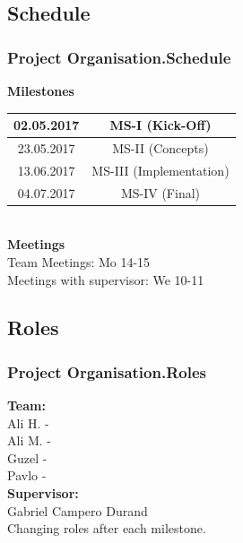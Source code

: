 \documentclass{beamer}
\begin{document}
\subsection{Schedule}
\begin{frame}
\frametitle{Project Organisation.Schedule}
\textbf{Milestones} \\
\vspace{0.5 cm}
\begin{tabular}{|c|c|}
\hline 
02.05.2017 & MS-I (Kick-Off) \\ 
\hline 
23.05.2017 & MS-II (Concepts) \\ 
\hline 
13.06.2017 & MS-III (Implementation) \\ 
\hline 
04.07.2017 & MS-IV (Final) \\ 
\hline 
\end{tabular}
\\ \vspace{0.5 cm}
\textbf{Meetings} \\ 
\vspace{0.5 cm}
\hspace{0.5 cm} Team Meetings: Mo 14-15 \\
\hspace{0.5 cm} Meetings with supervisor: We 10-11

\end{frame}

\subsection{Roles}
\begin{frame}
\frametitle{Project Organisation.Roles}

\textbf{Team:} \\
\hspace{0.3 cm}Ali H. - \\
\hspace{0.3 cm}Ali M. - \\
\hspace{0.3 cm}Guzel - \\
\hspace{0.3 cm}Pavlo - \\

\vspace{0.2 cm}
\textbf{Supervisor:} \\
\hspace{0.3 cm} Gabriel Campero Durand \\

\vspace{0.2 cm}
Changing roles after each milestone.

\end{frame}
\end{document}
